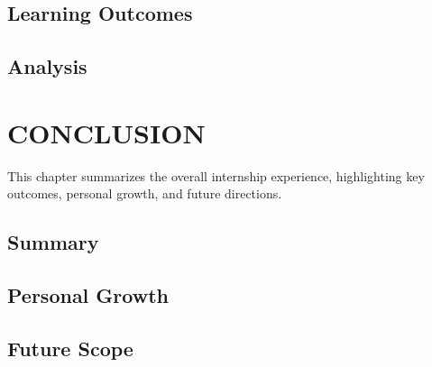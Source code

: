 \documentclass[12pt,a4paper]{report}
\begin{document}
\section{Learning Outcomes}


\section{Analysis}




\chapter{CONCLUSION}
\label{ch:conclusion}


This chapter summarizes the overall internship experience, highlighting key outcomes, personal growth, and future directions.




\section{Summary}


\section{Personal Growth}


\section{Future Scope}
\end{document}
